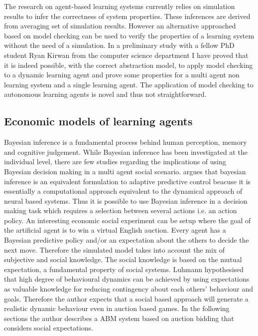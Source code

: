 The research on agent-based learning systems
currently relies on simulation results to infer the correctness of system properties.
These inferences are derived from averaging set of simulation results. 
However an alternative approached based on model checking can be used
to verify the properties of a learning system without the need of a simulation.
In a preliminary study with a fellow PhD student Ryan Kirwan from the computer
science department I have proved that it is indeed possible, with the correct
 abstraction model, to apply model checking to a dynamic learning agent and 
 prove some properties for a multi agent non learning system and a single
 learning agent.
The application of model checking to autonomous learning agents is novel
  and thus not straightforward.
  
\subsection{Economic models of learning agents}

Bayesian inference is a fundamental process behind human perception,
memory and cognitive judgement. While Bayesian inference has been investigated
 at the individual level, there are few studies regarding the implications of
 using Bayesian decision making in a multi agent social scenario.
\citet{Verschure98epistemol} argues that bayesian inference is an equivalent formulation to 
adaptive predictive control beacuse it is essentially a computational approach 
equivalent to the dynamical approach of neural based systems.
Thus it is possible to use Bayesian inference in a decision making task which requires
a selection between several actions i.e. an action policy.
An interesting economic social experiment can be setup where the goal of the
 artificial agent is to win a virtual English auction.
Every agent has a Bayesian predictive policy and/or an expectation about the
 others to decide the next move.
Therefore the simulated model takes into account the mix of subjective and
 social knowledge.
The social knowledge is based on the mutual expectation, a fundamental property
 of social systems. Luhmann hypothesised that high degree of behavioural dynamics
 can be achieved by using expectations as valuable knowledge for reducing
contingency about each others' behaviour and goals.
Therefore the author expects that a social based approach will generate
a realistic dynamic behaviour even in auction based games.
In the following sections the author describes a ABM system based on
 auction bidding that considers social expectations.

